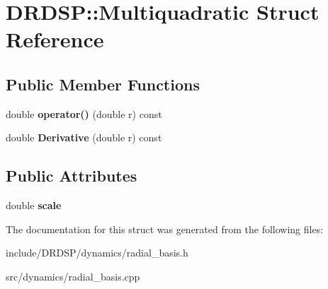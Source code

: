 \hypertarget{struct_d_r_d_s_p_1_1_multiquadratic}{\section{D\-R\-D\-S\-P\-:\-:Multiquadratic Struct Reference}
\label{struct_d_r_d_s_p_1_1_multiquadratic}
}
\subsection*{Public Member Functions}
\begin{DoxyCompactItemize}
\item 
\hypertarget{struct_d_r_d_s_p_1_1_multiquadratic_af06319ae007aa40fbd2833759161437f}{double {\bfseries operator()} (double r) const }\label{struct_d_r_d_s_p_1_1_multiquadratic_af06319ae007aa40fbd2833759161437f}

\item 
\hypertarget{struct_d_r_d_s_p_1_1_multiquadratic_afba9d7a5aeb541953b9a54919b013f5f}{double {\bfseries Derivative} (double r) const }\label{struct_d_r_d_s_p_1_1_multiquadratic_afba9d7a5aeb541953b9a54919b013f5f}

\end{DoxyCompactItemize}
\subsection*{Public Attributes}
\begin{DoxyCompactItemize}
\item 
\hypertarget{struct_d_r_d_s_p_1_1_multiquadratic_ad075ed2b3b85cab9d74369163eab65cf}{double {\bfseries scale}}\label{struct_d_r_d_s_p_1_1_multiquadratic_ad075ed2b3b85cab9d74369163eab65cf}

\end{DoxyCompactItemize}


The documentation for this struct was generated from the following files\-:\begin{DoxyCompactItemize}
\item 
include/\-D\-R\-D\-S\-P/dynamics/radial\-\_\-basis.\-h\item 
src/dynamics/radial\-\_\-basis.\-cpp\end{DoxyCompactItemize}
